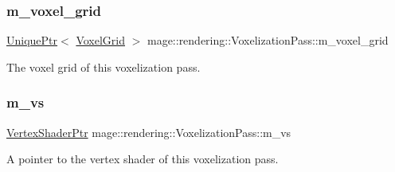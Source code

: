 \subsubsection{\texorpdfstring{m\+\_\+voxel\+\_\+grid}{m\_voxel\_grid}}
{\footnotesize\ttfamily \hyperlink{namespacemage_a3316d7143a973e37adf1110f2e80ca31}{Unique\+Ptr}$<$ \hyperlink{classmage_1_1rendering_1_1_voxel_grid}{Voxel\+Grid} $>$ mage\+::rendering\+::\+Voxelization\+Pass\+::m\+\_\+voxel\+\_\+grid\hspace{0.3cm}{\ttfamily [private]}}

The voxel grid of this voxelization pass. \hypertarget{classmage_1_1rendering_1_1_voxelization_pass_aa95ee5cba6cfdf82d115f080421aee1c}{}\label{classmage_1_1rendering_1_1_voxelization_pass_aa95ee5cba6cfdf82d115f080421aee1c} 
\subsubsection{\texorpdfstring{m\+\_\+vs}{m\_vs}}
{\footnotesize\ttfamily \hyperlink{namespacemage_1_1rendering_aaf704b9c54a4181f4950a1761de69dda}{Vertex\+Shader\+Ptr} mage\+::rendering\+::\+Voxelization\+Pass\+::m\+\_\+vs\hspace{0.3cm}{\ttfamily [private]}}

A pointer to the vertex shader of this voxelization pass. 